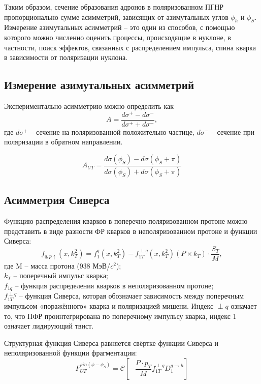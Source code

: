 \documentclass{extarticle}
\begin{document}
Таким образом, сечение образования адронов в поляризованном ПГНР пропорционально сумме асимметрий, зависящих от азимутальных углов $\phi_h$ и $\phi_S$. Измерение азимутальных асимметрий -- это один из способов, с помощью которого можно численно оценить процессы, происходящие в нуклоне, в частности, поиск эффектов, связанных с распределением импульса, спина кварка в зависимости от поляризации нуклона.
\subsection{Измерение азимутальных асимметрий}



Экспериментально асимметрию можно определить как 
\begin{equation}
	A = \frac{d\sigma^{+}-d\sigma^{-}}{d\sigma^{+}+d\sigma^{-}},
\end{equation}
где $d\sigma^{+}$ -- сечение на поляризованной положительно частице, $d\sigma^{-}$ -- сечение при поляризации в обратном направлении.


\begin{equation}
	A_{UT} = \frac{d\sigma(\phi_S)-d\sigma(\phi_S+\pi)}{d\sigma(\phi_S)+d\sigma(\phi_S+\pi)}
\end{equation}
\subsection{Асимметрия Сиверса}
Функцию распределения кварков в поперечно поляризованном протоне можно представить в виде разности ФР кварков в неполяризованном протоне и функции Сиверса:
\begin{equation}
	f_{q,p\uparrow} (x,k^2_T )=f_1^q (x,k^2_T )-f_{1T}^{\perp q} (x,k^2_T )(P\times k_T ) \cdot \frac{S_T}{M},
\end{equation}
где M – масса протона (938 МэВ/$c^2$); \\ $k_T$ – поперечный импульс кварка; \\ $f_{1q}$ – функция распределения кварков в неполяризованном протоне; \\ $f_{1T}^{\perp q}$ – функция Сиверса, которая обозначает зависимость между поперечным импульсом «поражённого» кварка и поляризацией мишени. Индекс $\perp q$ означает то, что ПФР проинтегрирована по поперечному импульсу кварка, индекс 1 означает лидирующий твист.

Структурная функция Сиверса равняется свёртке функции Сиверса и неполяризованной функции фрагментации:
\begin{equation}
	F^{sin(\phi-\phi_S)}_{UT} = \mathcal{C}[-\frac{P\cdot p_T}{M}f_{1T}^{\perp q}D_1^{q \rightarrow h}]
\end{equation}
\end{document}
